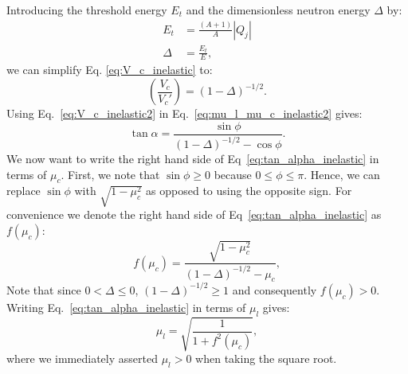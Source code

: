 \documentclass[review]{elsarticle}
\begin{document}
Introducing the threshold energy $E_t$ and the dimensionless neutron energy $\Delta$ by:
\begin{align}\label{eq:def_threshold}
  E_t & = \frac{(A+1)}{A}\left |Q_j\right |  \nonumber \\
  \Delta &= \frac{E_t}{E},
\end{align}
we can simplify Eq. \ref{eq:V_c_inelastic} to:
\begin{equation}\label{eq:V_c_inelastic2}
   \left( \frac{V_c}{V_c'} \right) = \left(1 - \Delta \right)^{-1/2}.
\end{equation}
Using Eq.~\ref{eq:V_c_inelastic2} in Eq.~\ref{eq:mu_l_mu_c_inelastic2} gives:
\begin{equation}\label{eq:tan_alpha_inelastic}
   \tan \alpha =  \frac{\sin \phi }{ \left(1 - \Delta \right)^{-1/2}  - \cos \phi}.
\end{equation}
We now want to write the right hand side of Eq~\ref{eq:tan_alpha_inelastic} in terms of $\mu_c$. First, we note that
$\sin \phi \ge 0$ because $0 \le \phi \le \pi$. Hence, we can replace $\sin \phi$ with $\sqrt{1 - \mu_c^2}$ as opposed to using the opposite sign.
For convenience we denote the right hand side of Eq~\ref{eq:tan_alpha_inelastic} as $f(\mu_c)$:
\begin{equation}
f(\mu_c) =  \frac{\sqrt{1 - \mu_c^2}}{ \left(1 - \Delta \right)^{-1/2}  - \mu_c},
\end{equation}
Note that since $0 < \Delta \le 0$, $\left(1 - \Delta \right)^{-1/2} \ge 1$ and consequently $f(\mu_c) > 0$.
Writing Eq.~\ref{eq:tan_alpha_inelastic} in terms of $\mu_l$ gives:
\begin{equation}\label{eq:mu_l_mu_c_inelastic_final}
  \mu_l = \sqrt{ \frac{1}{1 + f^2 (\mu_c)} },
\end{equation}
where we immediately asserted $\mu_l >0$ when taking the square root. 
\end{document}
